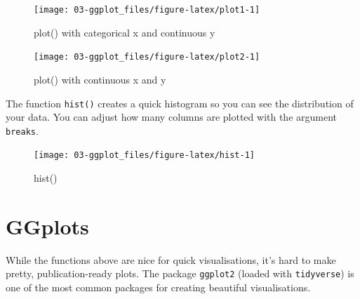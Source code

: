 \documentclass[
  oneside]{book}
\newenvironment{Shaded}{\begin{snugshade}}{\end{snugshade}}
\newcommand{\AttributeTok}[1]{\textcolor[rgb]{0.77,0.63,0.00}{#1}}
\newcommand{\DecValTok}[1]{\textcolor[rgb]{0.00,0.00,0.81}{#1}}
\newcommand{\FunctionTok}[1]{\textcolor[rgb]{0.00,0.00,0.00}{#1}}
\newcommand{\NormalTok}[1]{#1}
\newcommand{\SpecialCharTok}[1]{\textcolor[rgb]{0.00,0.00,0.00}{#1}}
\begin{document}
\begin{figure}

{\centering \texttt{[image: 03-ggplot\_files/figure-latex/plot1-1]} 

}

\caption{plot() with categorical x and continuous y}\label{fig:plot1}
\end{figure}

\begin{Shaded}
\end{Shaded}

\begin{figure}

{\centering \texttt{[image: 03-ggplot\_files/figure-latex/plot2-1]} 

}

\caption{plot() with continuous x and y}\label{fig:plot2}
\end{figure}

The function \texttt{hist()} creates a quick histogram so you can see the distribution of your data. You can adjust how many columns are plotted with the argument \texttt{breaks}.

\begin{Shaded}
\end{Shaded}

\begin{figure}

{\centering \texttt{[image: 03-ggplot\_files/figure-latex/hist-1]} 

}

\caption{hist()}\label{fig:hist}
\end{figure}

\hypertarget{ggplots}{%
\section{GGplots}\label{ggplots}}

While the functions above are nice for quick visualisations, it's hard to make pretty, publication-ready plots. The package \texttt{ggplot2} (loaded with \texttt{tidyverse}) is one of the most common packages for creating beautiful visualisations.
\end{document}
